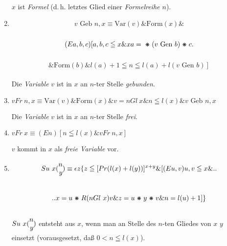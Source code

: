 \documentclass[draft]{scrartcl}
\begin{document}
\begin{enumerate}[1.]
	$x$ ist \textit{Formel} (d.\,h. letztes Glied einer \textit{Formelreihe $n$}).

	\item {}$$
		v \text{ Geb } n, x \equiv \text{Var}\left(v\right) \& \text{Form}\left(x\right) \& 
	$$\\[\spacebetweenbreakedequations]
	$$
	\left(Ea, b, c\right) \left[a, b, c \leqq x \& x a = \pmstar \left(v \text{ Gen } b\right) \pmstar c\right.
	$$\\[\spacebetweenbreakedequations]
	$$\left.\& \text{Form}\left(b\right) \& l\left(a\right) + 1 \leqq n \leqq l\left(a\right) + l\left(v \text{ Gen } b\right)\right]
	$$\\[\spaceafterbreakedequation]

	Die \textit{Variable} $v$ ist in $x$ an $n$-ter Stelle \textit{gebunden}.

	\item {}$v Fr\ n, x \equiv \text{Var}\left(v\right) \& \text{Form}\left(x\right) \& v = n Gl\ x \& n \leqq l\left(x\right) \& v \text{ Geb } n, x$

	Die \textit{Variable} $v$ ist in $x$ an $n$-ter Stelle \textit{frei}.

	\item $v Fr\ x \equiv \left(En\right) \left[n \leqq l\left(x\right) \& v Fr\ n, x\right]$%

	$v$ kommt in $x$ als \textit{freie Variable} vor.

	\item $$
		Su\ x \Spvek{n; y} \equiv \epsilon z \left\{ z \leqq \left[Pr\left(l\left(x\right) + l\left(y\right)\right)\right]^{x + y} \& \left[\left(Eu, v\right) u, v \leqq x \& \right.\right.
	$$\\[\spacebetweenbreakedequations]
	$$
		\left.\left.x = u \pmstar R\left(n Gl\ x\right) v \& z = u \pmstar y \pmstar v \& n = l\left(u\right) + 1\right]\right\}
	$$\\[\spacebetweenbreakedequations]

	$Su\ x \Spvek{n; y}$ entsteht aus $x$, wenn man an Stelle des $n$-ten Gliedes von $x$ $y$ einsetzt (vorausgesetzt, daß $0 < n \leqq l\left(x\right)$).


\end{enumerate}
\end{document}

